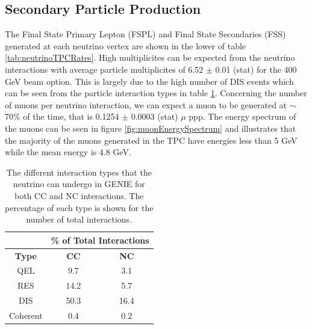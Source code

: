 \subsection{Secondary Particle Production}
The Final State Primary Lepton (FSPL) and Final State Secondaries (FSS) generated at each neutrino vertex are shown in the lower of table \ref{tab:neutrinoTPCRates}. High multiplicites can be expected from the neutrino interactions with average particle multiplicites of 6.52 $\pm$ 0.01 (stat) for the 400 GeV beam option. This is largely due to the high number of DIS events which can be seen from the particle interaction types in table \ref{tab:neutrinoInteractionTypes}. Concerning the number of muons per neutrino interaction, we can expect a muon to be generated at $\sim$70\% of the time, that is 0.1254 $\pm$ 0.0003 (stat) $\mu$ ppp. The energy spectrum of the muons can be seen in figure \ref{fig:muonEnergySpectrum} and illustrates that the majority of the muons generated in the TPC have energies less than 5 GeV while the mean energy is 4.8 GeV.
\begin{table}[tbp]
\centering
\begin{tabular}{ccc}
	\hline
	& \multicolumn{2}{c}{\% of Total Interactions} \\
	\hline
	 \textbf{Type} & \textbf{CC} & \textbf{NC} \\
	 \hline
	 \hline
	 QEL & 9.7 & 3.1\\
	 RES & 14.2 & 5.7 \\
	 DIS & 50.3 & 16.4\\
	 Coherent & 0.4 & 0.2 \\
	\hline
\end{tabular}
\caption{The different interaction types that the neutrino can undergo in GENIE for both CC and NC interactions. The percentage of each type is shown for the number of total interactions.}
\label{tab:neutrinoInteractionTypes}
\end{table}

